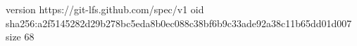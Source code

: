 version https://git-lfs.github.com/spec/v1
oid sha256:a2f5145282d29b278bc5eda8b0ec088c38bf6b9c33ade92a38c11b65dd01d007
size 68
